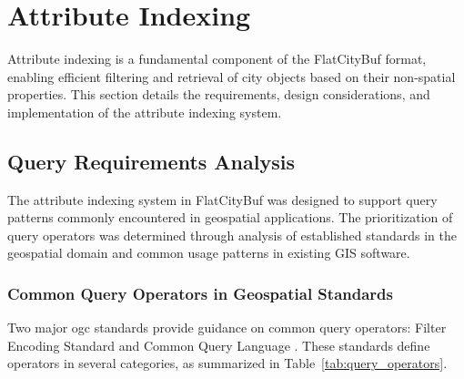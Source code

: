 
\section{Attribute Indexing}
\label{methodology:attribute_index}

Attribute indexing is a fundamental component of the FlatCityBuf format, enabling efficient filtering and retrieval of city objects based on their non-spatial properties. This section details the requirements, design considerations, and implementation of the attribute indexing system.

\subsection{Query Requirements Analysis}
\label{methodology:attribute_index:query_requirements}

The attribute indexing system in FlatCityBuf was designed to support query patterns commonly encountered in geospatial applications. The prioritization of query operators was determined through analysis of established standards in the geospatial domain and common usage patterns in existing GIS software.

\subsubsection{Common Query Operators in Geospatial Standards}
\label{methodology:attribute_index:query_requirements:standards}

Two major \ac{ogc} standards provide guidance on common query operators: Filter Encoding Standard \citep{ogc_filter_encoding_2010} and Common Query Language \citep{ogc_cql2_2024}. These standards define operators in several categories, as summarized in Table~\ref{tab:query_operators}.


